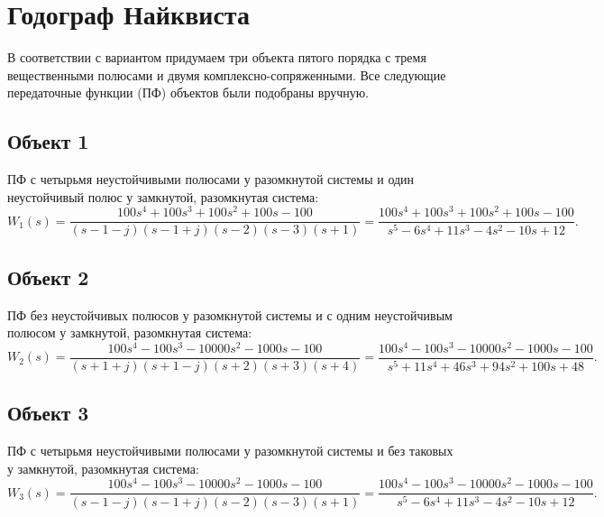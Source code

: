 \section{Годограф Найквиста}

В соответствии с вариантом придумаем три объекта пятого порядка с 
тремя вещественными полюсами и двумя комплексно-сопряженными. Все следующие
передаточные функции (ПФ) объектов были подобраны вручную.
 
\subsection{Объект 1}

ПФ с четырьмя неустойчивыми полюсами у разомкнутой системы и один неустойчивый полюс у замкнутой,
разомкнутая система:
\begin{equation*}
    W_1(s)=\frac{100s^4+100s^3+100s^2+100s-100}{(s-1-j)(s-1+j)(s-2)(s-3)(s+1)}
    = \frac{100s^4+100s^3+100s^2+100s-100}{s^5-6s^4+11s^3-4s^2-10s+12}.
\end{equation*}

\subsection{Объект 2}

ПФ без неустойчивых полюсов у разомкнутой системы и с одним неустойчивым полюсом у замкнутой,
разомкнутая система:
\begin{equation*}
    W_2(s)=\frac{100s^4-100s^3-10000s^2-1000s-100}{(s+1+j)(s+1-j)(s+2)(s+3)(s+4)}=
    \frac{100s^4-100s^3-10000s^2-1000s-100}{s^5+11s^4+46s^3+94s^2+100s+48}.
\end{equation*}

\subsection{Объект 3}

ПФ с четырьмя неустойчивыми полюсами у разомкнутой системы и без таковых у замкнутой,
разомкнутая система:
\begin{equation*}
    W_3(s)=\frac{100s^4-100s^3-10000s^2-1000s-100}{(s-1-j)(s-1+j)(s-2)(s-3)(s+1)}
    = \frac{100s^4-100s^3-10000s^2-1000s-100}{s^5-6s^4+11s^3-4s^2-10s+12}.
\end{equation*}
